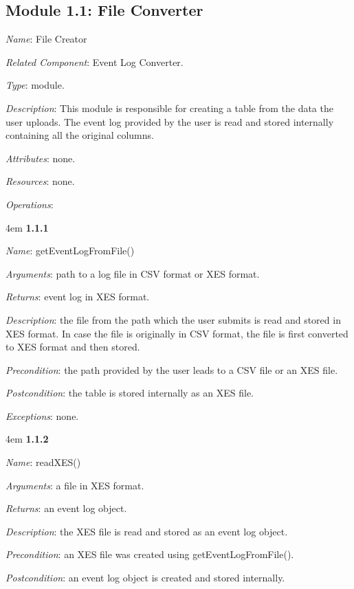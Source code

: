 \documentclass[notitlepage]{article}
\begin{document}
\begin{flushleft}
\subsection{Module 1.1: File Converter}
\textit{Name}: File Creator

\textit{Related Component}: Event Log Converter.

\textit{Type}: module.

\textit{Description}: This module is responsible for creating a table from the data the user uploads. The event log provided by the user is read and stored internally containing all the original columns. 

\textit{Attributes}: none.

\textit{Resources}: none.

\textit{Operations}: 
\medskip

\par
\begingroup
\leftskip4em
\textbf{1.1.1}

\textit{Name}: getEventLogFromFile()

\textit{Arguments}: path to a log file in CSV format or XES format.

\textit{Returns}: event log in XES format.

\textit{Description}: the file from the path which the user submits is read and stored in XES format. In case the file is originally in CSV format, the file is first converted to XES format and then stored.

\textit{Precondition}: the path provided by the user leads to a CSV file or an XES file.

\textit{Postcondition}: the table is stored internally as an XES file.

\textit{Exceptions}: none.
\par
\endgroup

\medskip

\par
\begingroup
\leftskip4em
\textbf{1.1.2}

\textit{Name}: readXES()

\textit{Arguments}: a file in XES format.

\textit{Returns}: an event log object.

\textit{Description}: the XES file is read and stored as an event log object.

\textit{Precondition}: an XES file was created using getEventLogFromFile().

\textit{Postcondition}: an event log object is created and stored internally.


\end{flushleft}
\end{document}
